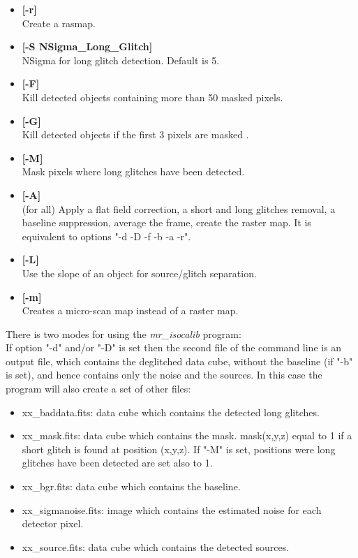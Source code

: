 \begin{itemize}
\item {\bf [-r]} \\
Create a rasmap.
\item {\bf [-S NSigma\_Long\_Glitch]} \\
NSigma for long glitch detection. Default is 5. 
\item {\bf [-F]} \\ 
Kill detected objects containing more than 50 masked  pixels.
\item {\bf [-G]} \\
Kill detected objects if the first 3 pixels are masked .
\item {\bf [-M]} \\
Mask pixels where long glitches have been detected.
\item {\bf [-A]} \\
(for all) Apply a flat field correction, a short and long glitches removal,
a baseline suppression, average the frame, create the raster map. It is equivalent
to options "-d -D -f -b -a -r".
\item {\bf [-L]} \\
Use the slope of an object for source/glitch separation.
\item {\bf [-m]} \\
Creates a micro-scan map instead of a raster map.
\end{itemize}

There is two modes for using the {\em mr\_isocalib} program: \\
If option "-d" and/or "-D" is set then the second file of the command
line is an output file, which contains the deglitched data cube, without
the baseline (if "-b" is set), and hence contains only the 
noise and the sources. In this case  the program will also create
a set of other files:
\begin{itemize}
\item xx\_baddata.fits: data cube which contains the detected long glitches.
\item xx\_mask.fits: data cube which contains the mask. mask(x,y,z) equal
to 1 if a short glitch is found at position (x,y,z). If "-M" is set, 
positions were long glitches have been detected are set also to 1.
\item xx\_bgr.fits: data cube which contains the baseline.
\item xx\_sigmanoise.fits: image which contains the estimated noise for each
detector pixel.
\item xx\_source.fits: data cube which contains the detected sources.
\end{itemize}

